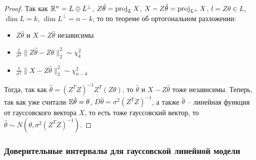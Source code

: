 \begin{proof}
    Так как $\mathbb{R}^n = L \oplus L^\perp$, $Z \hat{\theta} = \operatorname{proj}_L X$, $X - Z \hat{\theta} = \operatorname{proj}_{L^\perp} X$, $l = Z\theta \in L$, $\dim L = k$, $\dim L^\perp = n-k$, то по теореме об ортогональном разложении:
    \begin{itemize}
        \item $Z \hat{\theta}$ и $X - Z \hat{\theta}$ независимы
        \item $\frac{1}{\sigma^2} \|Z \hat{\theta} - Z \theta\|_2^2 \sim \chi^2_k$
        \item $\frac{1}{\sigma^2} \|X - Z\hat{\theta}\|_2^2 \sim \chi^2_{n-k}$
    \end{itemize}

    Тогда, так как $\hat{\theta} = (Z^T Z)^{-1} Z^T (Z \theta)$, то $\hat{\theta}$ и $X - Z \hat{\theta}$ тоже независимы. Теперь, так как уже считали $\mathbb{E}\hat{\theta} = \theta$, $D\hat{\theta} = \sigma^2 (Z^T Z)^{-1}$, а также $\hat{\theta}$ -- линейная функция от гауссовского вектора $X$, то есть тоже гауссовский вектор, то $\hat{\theta} \sim N(\theta, \sigma^2 (Z^T Z)^{-1})$.
\end{proof}

\subsubsection{Доверительные интервалы для гауссовской линейной модели}

